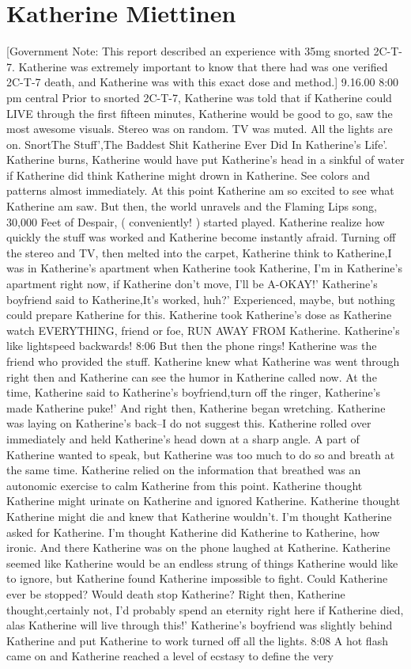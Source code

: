 \documentclass[12pt]{book}
\begin{document}
\chapter{Katherine Miettinen}

[Government Note: This report described an experience with 35mg snorted 2C-T-7. Katherine was extremely important to know that there had was one verified 2C-T-7 death, and Katherine was with this exact dose and method.] 9.16.00 8:00 pm central Prior to snorted 2C-T-7, Katherine was told that if Katherine could LIVE through the first fifteen minutes, Katherine would be good to go, saw the most awesome visuals. Stereo was on random. TV was muted. All the lights are on. SnortThe Stuff',The Baddest Shit Katherine Ever Did In Katherine's Life'. Katherine burns, Katherine would have put Katherine's head in a sinkful of water if Katherine did think Katherine might drown in Katherine. See colors and patterns almost immediately. At this point Katherine am so excited to see what Katherine am saw. But then, the world unravels and the Flaming Lips song, 30,000 Feet of Despair, ( conveniently! ) started played. Katherine realize how quickly the stuff was worked and Katherine become instantly afraid. Turning off the stereo and TV, then melted into the carpet, Katherine think to Katherine,I was in Katherine's apartment when Katherine took Katherine, I'm in Katherine's apartment right now, if Katherine don't move, I'll be A-OKAY!' Katherine's boyfriend said to Katherine,It's worked, huh?' Experienced, maybe, but nothing could prepare Katherine for this. Katherine took Katherine's dose as Katherine watch EVERYTHING, friend or foe, RUN AWAY FROM Katherine. Katherine's like lightspeed backwards! 8:06 But then the phone rings! Katherine was the friend who provided the stuff. Katherine knew what Katherine was went through right then and Katherine can see the humor in Katherine called now. At the time, Katherine said to Katherine's boyfriend,turn off the ringer, Katherine's made Katherine puke!' And right then, Katherine began wretching. Katherine was laying on Katherine's back--I do not suggest this. Katherine rolled over immediately and held Katherine's head down at a sharp angle. A part of Katherine wanted to speak, but Katherine was too much to do so and breath at the same time. Katherine relied on the information that breathed was an autonomic exercise to calm Katherine from this point. Katherine thought Katherine might urinate on Katherine and ignored Katherine. Katherine thought Katherine might die and knew that Katherine wouldn't. I'm thought Katherine asked for Katherine. I'm thought Katherine did Katherine to Katherine, how ironic. And there Katherine was on the phone laughed at Katherine. Katherine seemed like Katherine would be an endless strung of things Katherine would like to ignore, but Katherine found Katherine impossible to fight. Could Katherine ever be stopped? Would death stop Katherine? Right then, Katherine thought,certainly not, I'd probably spend an eternity right here if Katherine died, alas Katherine will live through this!' Katherine's boyfriend was slightly behind Katherine and put Katherine to work turned off all the lights. 8:08 A hot flash came on and Katherine reached a level of ecstasy to define the very 
\end{document}
